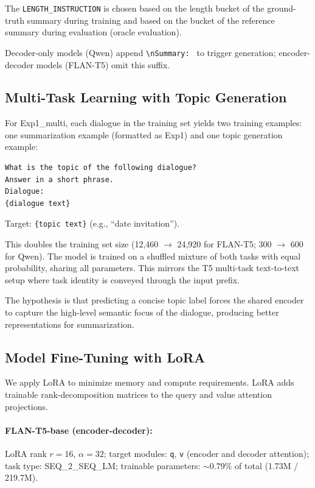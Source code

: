\documentclass[11pt,a4paper]{article}
\begin{document}
The \texttt{LENGTH\_INSTRUCTION} is chosen based on the length bucket of the ground-truth summary during training and based on the bucket of the reference summary during evaluation (oracle evaluation).

Decoder-only models (Qwen) append \texttt{\textbackslash nSummary:~} to trigger generation; encoder-decoder models (FLAN-T5) omit this suffix.

\subsection{Multi-Task Learning with Topic Generation}

For Exp1\_multi, each dialogue in the training set yields two training examples: one summarization example (formatted as Exp1) and one topic generation example:

\begin{lstlisting}
What is the topic of the following dialogue?
Answer in a short phrase.
Dialogue:
{dialogue text}
\end{lstlisting}

\noindent Target: \texttt{\{topic text\}} (e.g., ``date invitation'').

This doubles the training set size (12,460 $\to$ 24,920 for FLAN-T5; 300 $\to$ 600 for Qwen).
The model is trained on a shuffled mixture of both tasks with equal probability, sharing all parameters.
This mirrors the T5 multi-task text-to-text setup where task identity is conveyed through the input prefix.

The hypothesis is that predicting a concise topic label forces the shared encoder to capture the high-level semantic focus of the dialogue, producing better representations for summarization.

\subsection{Model Fine-Tuning with LoRA}

We apply LoRA to minimize memory and compute requirements.
LoRA adds trainable rank-decomposition matrices to the query and value attention projections.

\paragraph{FLAN-T5-base (encoder-decoder):}
LoRA rank $r{=}16$, $\alpha{=}32$; target modules: \texttt{q}, \texttt{v} (encoder and decoder attention); task type: SEQ\_2\_SEQ\_LM; trainable parameters: ${\sim}0.79\%$ of total (1.73M / 219.7M).
\end{document}
